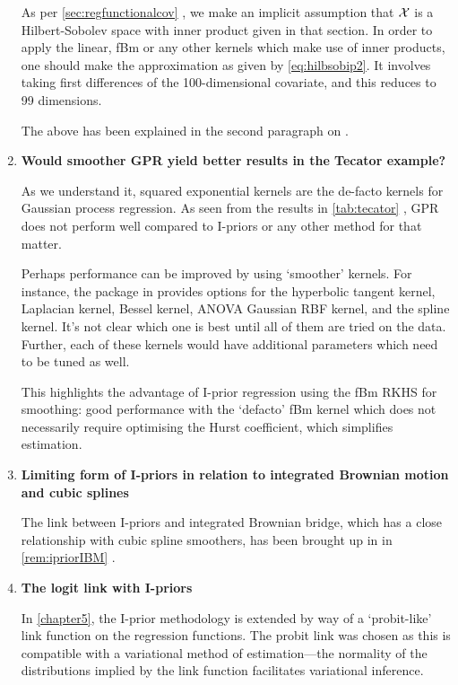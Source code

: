 \documentclass[11pt,openright,twoside]{report}
\begin{document}
\begin{enumerate}
  As per \cref{sec:regfunctionalcov} , we make an implicit assumption that ${\mathcal X}$ is a Hilbert-Sobolev space with inner product given in that section.
  In order to apply the linear, fBm or any other kernels which make use of inner products, one should make the approximation as given by \cref{eq:hilbsobip2}.
  It involves taking first differences of the 100-dimensional covariate, and this reduces to 99 dimensions.
  
  The above has been explained in the second paragraph on .

  \item \textbf{Would smoother GPR yield better results in the Tecator example?}

  As we understand it, squared exponential kernels are the de-facto kernels for Gaussian process regression.
  As seen from the results in \cref{tab:tecator} , GPR does not perform well compared to I-priors or any other method for that matter.
  
  Perhaps performance can be improved by using `smoother' kernels.
  For instance, the  package in  provides options for the hyperbolic tangent kernel, Laplacian kernel, Bessel kernel, ANOVA Gaussian RBF kernel, and the spline kernel.
  It's not clear which one is best until all of them are tried on the data.
  Further, each of these kernels would have additional parameters which need to be tuned as well.
  
  This highlights the advantage of I-prior regression using the fBm RKHS for smoothing: good performance with the `defacto' fBm kernel which does not necessarily require optimising the Hurst coefficient, which simplifies estimation.
  
  
  \item \textbf{Limiting form of I-priors in relation to integrated Brownian motion and cubic splines}

  The link between I-priors and integrated Brownian bridge, which has a close relationship with cubic spline smoothers, has been brought up in in \cref{rem:ipriorIBM} .

  \item \textbf{The logit link with I-priors}
  
  In \cref{chapter5}, the I-prior methodology is extended by way of a `probit-like' link function on the regression functions. 
  The probit link was chosen as this is compatible with a variational method of estimation---the normality of the distributions implied by the link function facilitates variational inference.
  

\end{enumerate}
\end{document}

